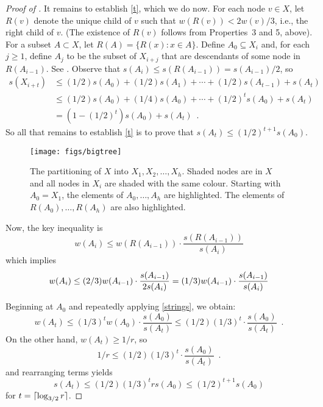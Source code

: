 \documentclass{patmorin}
\begin{document}
\begin{proof}[Proof of ]
  It remains to establish \eqref{t}, which we do now.  For each node
  $v\in X$, let $R(v)$ denote the unique child of $v$ such that $w(R(v))
  < 2w(v)/3$, i.e., the right child of $v$. (The existence of $R(v)$ follows from Properties~3 and
  5, above).  For a subset $A\subset X$, let $R(A)=\{R(x):x\in A\}$.
  Define $A_0\subseteq X_i$ and, for each $j\ge 1$, define $A_j$
  to be the subset of $X_{i+j}$ that are descendants of some node in
  $R(A_{i-1})$.  See . Observe that $s(A_i) \le s(R(A_{i-1})) = s(A_{i-1})/2$,
  so 
   \begin{align*}
      s(X_{i+t}) 
         &\le (1/2)s(A_0) + (1/2)s(A_1) + \cdots + (1/2)s(A_{t-1}) + s(A_t) \\
         &\le (1/2)s(A_0) + (1/4)s(A_0) + \cdots + (1/2)^t s(A_{0}) + s(A_t) \\
         &  = (1-(1/2)^t)s(A_0) + s(A_t) \enspace .
   \end{align*}
  So all that remains to establish \eqref{t} is to prove that 
  $s(A_t)\le (1/2)^{t+1}s(A_0)$.

  \begin{figure}
    \begin{center}
       \texttt{[image: figs/bigtree]}
    \end{center}
    \caption{The partitioning of $X$ into $X_1,X_2,\ldots,X_h$. Shaded
    nodes are in $X$ and all nodes in $X_i$ are shaded with the same
    colour.   Starting with $A_0=X_1$, the elements of $A_0,\ldots,A_h$
    are highlighted.  The elements of $R(A_0),\ldots,R(A_h)$ are also highlighted.}
  \end{figure}

  Now, the key inequality is 
  \begin{equation}
      w(A_i) \le w(R(A_{i-1}))\cdot\frac{s(R(A_{i-1}))}{s(A_i)}
  \end{equation}
  which implies
  \begin{equation}
       w(A_i) \le (2/3)w(A_{i-1})\cdot\frac{s(A_{i-1})}{2s(A_i)}
             = (1/3)w(A_{i-1})\cdot\frac{s(A_{i-1})}{s(A_i)}
             \eqlabel{strings}
  \end{equation}

  Beginning at $A_0$ and repeatedly applying \eqref{strings}, we obtain:
  \[
      w(A_t) \le (1/3)^t w(A_0)\cdot\frac{s(A_0)}{s(A_t)} 
             \le (1/2)(1/3)^t \cdot\frac{s(A_0)}{s(A_t)} \enspace .
  \]
  On the other hand, $w(A_t)\ge 1/r$, so  
  \[ 
      1/r \le (1/2)(1/3)^t\cdot\frac{s(A_0)}{s(A_t)} \enspace .
  \]
  and rearranging terms yields
  \[
     s(A_t) \le (1/2)(1/3)^t r s(A_0) \le (1/2)^{t+1}s(A_0)
  \]
  for $t = {\lceil \log_{3/2} r \rceil}$.
\end{proof}
\end{document}
